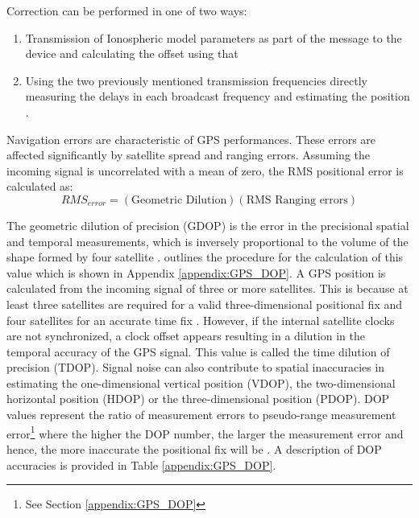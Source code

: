  Correction can be performed in one of two ways:
\begin{enumerate}
	\item Transmission of Ionospheric model parameters as part of the message to the device and calculating the offset using that
	\item Using the two previously mentioned transmission frequencies directly measuring the delays in each broadcast frequency and estimating the position \cite{spilker1996global}.
\end{enumerate}

Navigation errors are characteristic of GPS performances. These errors are affected significantly by satellite spread and ranging errors. Assuming the incoming signal is uncorrelated with a mean of zero, the RMS positional error is calculated as:
\begin{equation}
	RMS_{error} = (\text{Geometric Dilution})(\text{RMS Ranging errors})
\end{equation}

The geometric dilution of precision (GDOP) is the error in the precisional spatial and temporal measurements, which is inversely proportional to the volume of the shape formed by four satellite \cite{jwo2001efficient}. \textcite{jwo2001efficient} outlines the procedure for the calculation of this value which is shown in Appendix \ref{appendix:GPS_DOP}. A GPS position is calculated from the incoming signal of three or more satellites. This is because at least three satellites are required for a valid three-dimensional positional fix and four satellites for an accurate time fix \cite{jwo2001efficient,spilker1996global}. However, if the internal satellite clocks are not synchronized, a clock offset appears resulting in a dilution in the temporal accuracy of the GPS signal. This value is called the time dilution of precision (TDOP). Signal noise can also contribute to spatial inaccuracies in estimating the one-dimensional vertical position (VDOP), the two-dimensional horizontal position (HDOP) or the three-dimensional position (PDOP). DOP values represent the ratio of measurement errors to pseudo-range measurement error\footnote{See Section \ref{appendix:GPS_DOP}} where the higher the DOP number, the larger the measurement error and hence, the more inaccurate the positional fix will be \cite{tahsin2015analysis}. A description of DOP accuracies is provided in Table \ref{appendix:GPS_DOP}.


